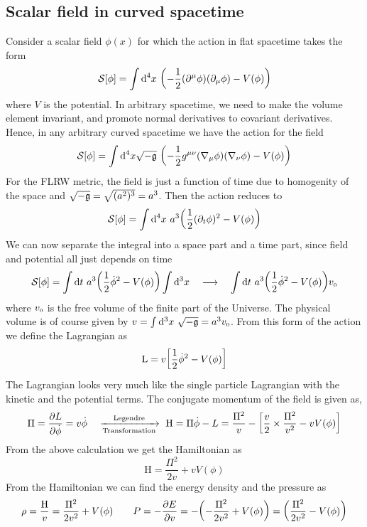 \subsection{Scalar field in curved spacetime}
Consider a scalar field $\phi(x)$ for which the action in flat spacetime takes the form 
$$\Ss[\phi] = \int \dd^4 x \ \qty(-\frac{1}{2}(\partial^\mu \phi)(\partial_\mu \phi) - V(\phi))$$
where $V$ is the potential. In arbitrary spacetime, we need to make the volume element invariant, and promote normal derivatives to covariant derivatives. Hence, in any arbitrary curved spacetime we have the action for the field
\begin{align}\label{eqn:scalarfield}
    \Ss[\phi] = \int \dd^4 x \detm \ \qty(-\frac{1}{2}g^{\mu\nu}(\covd{\mu} \phi)(\covd{\nu} \phi) - V(\phi))
\end{align}
For the FLRW metric, the field is just a function of time due to homogenity of the space and $\sqrt{-\mathfrak{g}} = \sqrt{(a^2)^3} = a^3$. Then the action reduces to 
\begin{align*}
\mathcal S[\phi] = \int \dd^4 x\ a^3 \qty(\frac{1}{2}(\partial_t \phi)^2 - V(\phi))
\end{align*}
We can now separate the integral into a space part and a time part, since field and potential all just depends on time 
$$\mathcal S[\phi] = \int \dd t \  a^3 \qty(\frac{1}{2}\dot{\phi}^2 - V(\phi)) \int \dd^3 x\quad \longrightarrow\quad\int \dd t \  a^3 \qty(\frac{1}{2}\dot{\phi}^2 - V(\phi))v_{\text{\tiny 0}}
$$
where $v_{\text{\tiny 0}}$ is the free volume of the finite part of the Universe. The physical volume is of course given by $v = \int \dd^3 x\ \sqrt{-\mathfrak{g}} = a^3 v_{\text{\tiny 0}}$. From this form of the action we define the Lagrangian as 
$$\mathrm{L} = v \qty[\frac{1}{2}\dot{\phi}^2 - V(\phi)]$$
The Lagrangian looks very much like the single particle Lagrangian with the kinetic and the potential terms. The conjugate momentum of the field is given as,
\begin{align*}
    \Pi = \pdv{L}{\dot{\phi}} = v\dot{\phi} \quad \xrightarrow[\text{Transformation}]{\text{Legendre}} \ \mathrm{H}= \Pi \dot{\phi} - L = \frac{\Pi^2}{v} - \qty[\frac{v}{2} \times  \frac{\Pi^2}{v^2} - vV(\phi)]
\end{align*}
From the above calculation we get the Hamiltonian as  
$$\mathrm{H} = \frac{\Pi^2}{2v}+ vV(\phi)$$
From the Hamiltonian we can find the energy density and the pressure as $$\rho = \frac{\mathrm{H}}{v}=\frac{\Pi^2}{2v^2}+ V(\phi) \qquad P = -\frac{\partial E}{\partial v} = -\qty(-\frac{\Pi^2}{2v^2}+ V(\phi) ) = \qty(\frac{\Pi^2}{2v^2}- V(\phi) )$$
